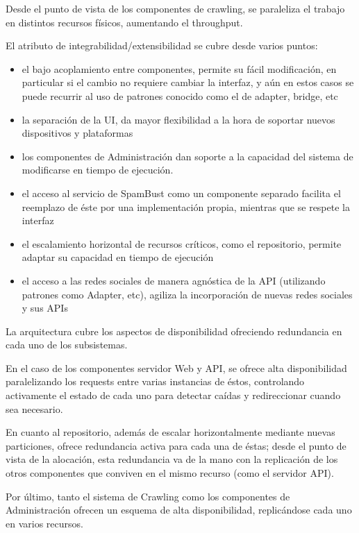 Desde el punto de vista de los componentes de crawling, se paraleliza el trabajo en distintos recursos f\'isicos, aumentando el throughput.

El atributo de integrabilidad/extensibilidad se cubre desde varios puntos:

\begin{itemize}
\item el bajo acoplamiento entre componentes, permite su f\'acil modificaci\'on, en particular si el cambio no requiere cambiar la interfaz, y a\'un en estos casos se puede recurrir al uso de patrones conocido como el de adapter, bridge, etc
\item la separaci\'on de la UI, da mayor flexibilidad a la hora de soportar nuevos dispositivos y plataformas
\item los componentes de Administraci\'on dan soporte a la capacidad del sistema de modificarse en tiempo de ejecuci\'on.
\item el acceso al servicio de SpamBust como un componente separado facilita el reemplazo de \'este por una implementaci\'on propia, mientras que se respete la interfaz
\item el escalamiento horizontal de recursos cr\'iticos, como el repositorio, permite adaptar su capacidad en tiempo de ejecuci\'on
\item el acceso a las redes sociales de manera agn\'ostica de la API (utilizando patrones como Adapter, etc), agiliza la incorporaci\'on de nuevas redes sociales y sus APIs
\end{itemize}
  
La arquitectura cubre los aspectos de disponibilidad ofreciendo redundancia en cada uno de los subsistemas.

En el caso de los componentes servidor Web y API, se ofrece alta disponibilidad paralelizando los requests entre varias instancias de \'estos, controlando activamente el estado de cada uno para detectar ca\'idas y redireccionar cuando sea necesario.

En cuanto al repositorio, adem\'as de escalar horizontalmente mediante nuevas particiones, ofrece redundancia activa para cada una de \'estas; desde el punto de vista de la alocaci\'on, esta redundancia va de la mano con la replicaci\'on de los otros componentes que conviven en el mismo recurso (como el servidor API).

Por \'ultimo, tanto el sistema de Crawling como los componentes de Administraci\'on ofrecen un esquema de alta disponibilidad, replic\'andose cada uno en varios recursos.

